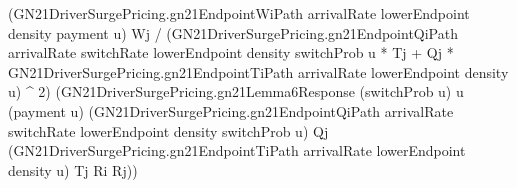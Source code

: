 \documentclass[10pt]{article}
\begin{document}
\begin{ReviewVerbatim}
                                                (GN21DriverSurgePricing.gn21EndpointWiPath arrivalRate lowerEndpoint
                                                  density payment u)
                                                Wj /
                                            (GN21DriverSurgePricing.gn21EndpointQiPath arrivalRate switchRate
                                                    lowerEndpoint density switchProb u *
                                                  Tj +
                                                Qj *
                                                  GN21DriverSurgePricing.gn21EndpointTiPath arrivalRate lowerEndpoint
                                                    density u) ^
                                              2)
                                          (GN21DriverSurgePricing.gn21Lemma6Response (switchProb u) u (payment u)
                                            (GN21DriverSurgePricing.gn21EndpointQiPath arrivalRate switchRate
                                              lowerEndpoint density switchProb u)
                                            Qj
                                            (GN21DriverSurgePricing.gn21EndpointTiPath arrivalRate lowerEndpoint density
                                              u)
                                            Tj Ri Rj))
\end{ReviewVerbatim}
\end{document}
